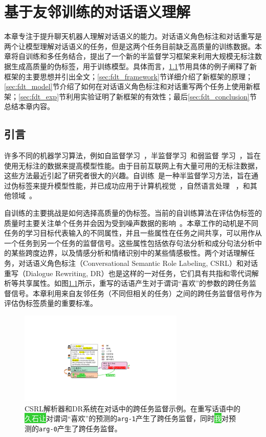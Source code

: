 \chapter{基于友邻训练的对话语义理解}
\label{cha:fdt}
本章专注于提升聊天机器人理解对话语义的能力。对话语义角色标注和对话重写是两个让模型理解对话语义的任务，但是这两个任务目前缺乏高质量的训练数据。本章将自训练和多任务结合，提出了一个新的半监督学习框架来利用大规模无标注数据生成高质量的伪标签，用于训练模型。具体而言，\ref{sec:fdt-intro}节用具体的例子阐释了新框架的主要思想并引出全文；\ref{sec:fdt_framework}节详细介绍了新框架的原理；\ref{sec:fdt_model}节介绍了如何在对话语义角色标注和对话重写两个任务上使用新框架；\ref{sec:fdt_exp}节利用实验证明了新框架的有效性；最后\ref{sec:fdt_conclusion}节总结本章内容。

\section{引言}\label{sec:fdt-intro}

许多不同的机器学习算法，例如⾃监督学习~\cite{Mikolov2013-mr,devlin2018bert,liu2021self}，半监督学习~\citep{yang2021survey}和弱监督
学习~\cite{zhou2018brief}，旨在使⽤无标注的数据来提⾼模型性能。由于目前互联网上有大量可⽤的无标注数据，这些方法最近引起了研究者很大的兴趣。⾃训练~\cite{scudder1965probability}是⼀种半监督学习方法，旨在通过伪标签来提升模型性能，并已成功应用于计算机视觉~\cite{lee2013pseudo,chen2021semi}，自然语言处理 ~\cite{dong2011ensemble,bhat2021self}，和其他领域~\cite{wang2019attributed,kahn2020self}。

自训练的主要挑战是如何选择高质量的伪标签。当前的⾃训练算法在评估伪标签的质量时主要关注单个任务并会因为受到噪声数据的影响~\cite{zhang2021understanding}。本章⼯作的动机是不同任务的学习⽬标代表输⼊的不同属性，并且⼀些属性在任务之间共享，可以⽤作从⼀个任务到另⼀个任务的监督信号。这些属性包括依存句法分析和成分句法分析中的某些跨度边界，以及情感分析和情绪识别中的某些情感极性。两个对话理解任务，对话语义角色标注（Conversational Semantic Role Labeling, CSRL）和对话重写（Dialogue Rewriting, DR）也是这样的⼀对任务，它们具有共指和零代词解析等共享属性。如图\ref{fig:fdt_intro}所示，重写的话语产生对于谓词“喜欢”的参数的跨任务监督信号。本章利用来自友邻任务（不同但相关的任务）之间的跨任务监督信号作为评估伪标签质量的重要标准。

\begin{figure}[!t]
\centering
\includegraphics[width=0.7\textwidth]{pics/intro.pdf}
\caption{CSRL解析器和DR系统在对话中的跨任务监督示例。在重写话语中的\colorbox{LimeGreen}{\textcolor{white}{久石让}}对谓词“喜欢”的预测的\texttt{arg-1}产生了跨任务监督，同时\colorbox{LimeGreen}{\textcolor{white}{我}}对预测的\texttt{arg-0}产生了跨任务监督。}\label{fig:fdt_intro}
\end{figure}

